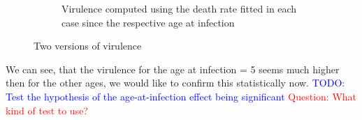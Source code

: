 \documentclass[10pt]{article}         %
\begin{document}
{\begin{figure}[H]
\begin{subfigure}[b]{0.5\textwidth}
    \caption{Virulence computed using the death rate fitted in each case since the respective age at infection}
    \label{fig:subfigure_2}
  \end{subfigure}
  \caption{Two versions of virulence}
  \label{fig:virulences}
\end{figure}}

We can see, that the virulence for the age at infection = 5 seems much higher then for the other ages, we would like to confirm this statistically now.\newline\newline
\textcolor{blue}{TODO: Test the hypothesis of the age-at-infection effect being significant}\newline
\textcolor{red}{Question: What kind of test to use?}




\end{document}
